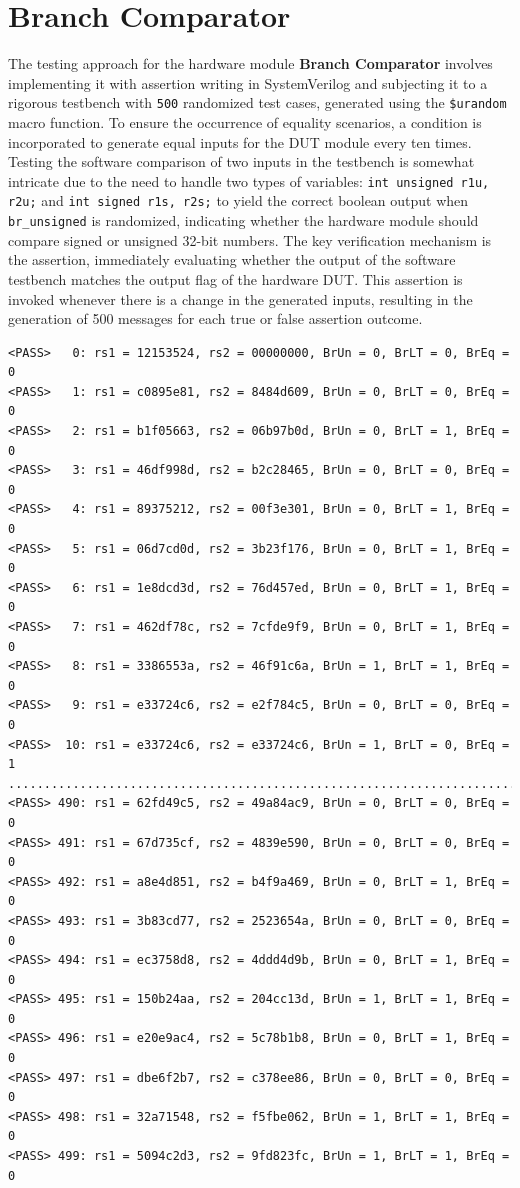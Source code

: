 \documentclass[12pt,a4paper,oneside]{book} %
\begin{document}
\section{Branch Comparator}
The testing approach for the hardware module \textbf{Branch Comparator} involves implementing it with assertion writing in SystemVerilog and subjecting it to a rigorous testbench with \texttt{500} randomized test cases, generated using the \texttt{\$urandom} macro function. To ensure the occurrence of equality scenarios, a condition is incorporated to generate equal inputs for the DUT module every ten times. Testing the software comparison of two inputs in the testbench is somewhat intricate due to the need to handle two types of variables: \texttt{int unsigned r1u, r2u;} and \texttt{int signed r1s, r2s;} to yield the correct boolean output when \texttt{br\_unsigned} is randomized, indicating whether the hardware module should compare signed or unsigned 32-bit numbers. The key verification mechanism is the assertion, immediately evaluating whether the output of the software testbench matches the output flag of the hardware DUT. This assertion is invoked whenever there is a change in the generated inputs, resulting in the generation of 500 messages for each true or false assertion outcome.
\begin{verbatim}
<PASS>   0: rs1 = 12153524, rs2 = 00000000, BrUn = 0, BrLT = 0, BrEq = 0
<PASS>   1: rs1 = c0895e81, rs2 = 8484d609, BrUn = 0, BrLT = 0, BrEq = 0
<PASS>   2: rs1 = b1f05663, rs2 = 06b97b0d, BrUn = 0, BrLT = 1, BrEq = 0
<PASS>   3: rs1 = 46df998d, rs2 = b2c28465, BrUn = 0, BrLT = 0, BrEq = 0
<PASS>   4: rs1 = 89375212, rs2 = 00f3e301, BrUn = 0, BrLT = 1, BrEq = 0
<PASS>   5: rs1 = 06d7cd0d, rs2 = 3b23f176, BrUn = 0, BrLT = 1, BrEq = 0
<PASS>   6: rs1 = 1e8dcd3d, rs2 = 76d457ed, BrUn = 0, BrLT = 1, BrEq = 0
<PASS>   7: rs1 = 462df78c, rs2 = 7cfde9f9, BrUn = 0, BrLT = 1, BrEq = 0
<PASS>   8: rs1 = 3386553a, rs2 = 46f91c6a, BrUn = 1, BrLT = 1, BrEq = 0
<PASS>   9: rs1 = e33724c6, rs2 = e2f784c5, BrUn = 0, BrLT = 0, BrEq = 0
<PASS>  10: rs1 = e33724c6, rs2 = e33724c6, BrUn = 1, BrLT = 0, BrEq = 1
........................................................................
<PASS> 490: rs1 = 62fd49c5, rs2 = 49a84ac9, BrUn = 0, BrLT = 0, BrEq = 0
<PASS> 491: rs1 = 67d735cf, rs2 = 4839e590, BrUn = 0, BrLT = 0, BrEq = 0
<PASS> 492: rs1 = a8e4d851, rs2 = b4f9a469, BrUn = 0, BrLT = 1, BrEq = 0
<PASS> 493: rs1 = 3b83cd77, rs2 = 2523654a, BrUn = 0, BrLT = 0, BrEq = 0
<PASS> 494: rs1 = ec3758d8, rs2 = 4ddd4d9b, BrUn = 0, BrLT = 1, BrEq = 0
<PASS> 495: rs1 = 150b24aa, rs2 = 204cc13d, BrUn = 1, BrLT = 1, BrEq = 0
<PASS> 496: rs1 = e20e9ac4, rs2 = 5c78b1b8, BrUn = 0, BrLT = 1, BrEq = 0
<PASS> 497: rs1 = dbe6f2b7, rs2 = c378ee86, BrUn = 0, BrLT = 0, BrEq = 0
<PASS> 498: rs1 = 32a71548, rs2 = f5fbe062, BrUn = 1, BrLT = 1, BrEq = 0
<PASS> 499: rs1 = 5094c2d3, rs2 = 9fd823fc, BrUn = 1, BrLT = 1, BrEq = 0
\end{verbatim}
\end{document}
